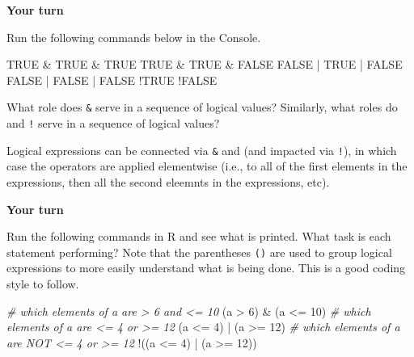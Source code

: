 \documentclass[
]{book}
\newenvironment{Shaded}{\begin{snugshade}}{\end{snugshade}}
\newcommand{\CommentTok}[1]{\textcolor[rgb]{0.56,0.35,0.01}{\textit{#1}}}
\newcommand{\ConstantTok}[1]{\textcolor[rgb]{0.00,0.00,0.00}{#1}}
\newcommand{\DecValTok}[1]{\textcolor[rgb]{0.00,0.00,0.81}{#1}}
\newcommand{\NormalTok}[1]{#1}
\newcommand{\SpecialCharTok}[1]{\textcolor[rgb]{0.00,0.00,0.00}{#1}}
\theoremstyle{definition}
\theoremstyle{definition}
\theoremstyle{definition}
\theoremstyle{definition}
\theoremstyle{remark}
\begin{document}
\begin{yourturn}
\textbf{Your turn}

Run the following commands below in the Console.

\begin{Shaded}
\begin{Highlighting}[]
\ConstantTok{TRUE} \SpecialCharTok{\&} \ConstantTok{TRUE} \SpecialCharTok{\&} \ConstantTok{TRUE}
\ConstantTok{TRUE} \SpecialCharTok{\&} \ConstantTok{TRUE} \SpecialCharTok{\&} \ConstantTok{FALSE}
\ConstantTok{FALSE} \SpecialCharTok{|} \ConstantTok{TRUE} \SpecialCharTok{|} \ConstantTok{FALSE}
\ConstantTok{FALSE} \SpecialCharTok{|} \ConstantTok{FALSE} \SpecialCharTok{|} \ConstantTok{FALSE}
\SpecialCharTok{!}\ConstantTok{TRUE}
\SpecialCharTok{!}\ConstantTok{FALSE}
\end{Highlighting}
\end{Shaded}

What role does \texttt{\&} serve in a sequence of logical values? Similarly, what roles do \texttt{\textbar{}} and \texttt{!} serve in a sequence of logical values?

\end{yourturn}

Logical expressions can be connected via \texttt{\&} and \texttt{\textbar{}} (and impacted via \texttt{!}), in which case the operators are applied elementwise (i.e., to all of the first elements in the expressions, then all the second eleemnts in the expressions, etc).

\begin{yourturn}

\textbf{Your turn}

Run the following commands in R and see what is printed. What task is each statement performing? Note that the parentheses \texttt{()} are used to group logical expressions to more easily understand what is being done. This is a good coding style to follow.

\begin{Shaded}
\begin{Highlighting}[]
\CommentTok{\# which elements of a are \textgreater{} 6 and \textless{}= 10}
\NormalTok{(a }\SpecialCharTok{\textgreater{}} \DecValTok{6}\NormalTok{) }\SpecialCharTok{\&}\NormalTok{ (a }\SpecialCharTok{\textless{}=} \DecValTok{10}\NormalTok{)}
\CommentTok{\# which elements of a are \textless{}= 4 or \textgreater{}= 12}
\NormalTok{(a }\SpecialCharTok{\textless{}=} \DecValTok{4}\NormalTok{) }\SpecialCharTok{|}\NormalTok{ (a }\SpecialCharTok{\textgreater{}=} \DecValTok{12}\NormalTok{)}
\CommentTok{\# which elements of a are NOT \textless{}= 4 or \textgreater{}= 12}
\SpecialCharTok{!}\NormalTok{((a }\SpecialCharTok{\textless{}=} \DecValTok{4}\NormalTok{) }\SpecialCharTok{|}\NormalTok{ (a }\SpecialCharTok{\textgreater{}=} \DecValTok{12}\NormalTok{))}
\end{Highlighting}
\end{Shaded}

\end{yourturn}
\end{document}
